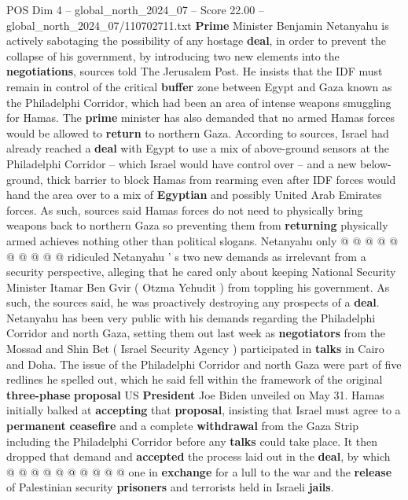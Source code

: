 \begin{textsample}{POS Dim 4 – global\_north\_2024\_07 – Score 22.00 – global\_north\_2024\_07/110702711.txt}  \label{ex:f4_pos_180}
\textbf{Prime} Minister Benjamin Netanyahu is actively sabotaging the possibility of any hostage \textbf{deal}, in order to prevent the collapse of his government, by introducing two new elements into the \textbf{negotiations}, sources told The Jerusalem Post.
He insists that the IDF must remain in control of the critical \textbf{buffer} zone between Egypt and Gaza known as the Philadelphi Corridor, which had been an area of intense weapons smuggling for Hamas.
The \textbf{prime} minister has also demanded that no armed Hamas forces would be allowed to \textbf{return} to northern Gaza.
According to sources, Israel had already reached a \textbf{deal} with Egypt to use a mix of above-ground sensors at the Philadelphi Corridor -- which Israel would have control over -- and a new below-ground, thick barrier to block Hamas from rearming even after IDF forces would hand the area over to a mix of \textbf{Egyptian} and possibly United Arab Emirates forces.
As such, sources said Hamas forces do not need to physically bring weapons back to northern Gaza so preventing them from \textbf{returning} physically armed achieves nothing other than political slogans.
Netanyahu only @ @ @ @ @ @ @ @ @ @ ridiculed Netanyahu ' s two new demands as irrelevant from a security perspective, alleging that he cared only about keeping National Security Minister Itamar Ben Gvir ( Otzma Yehudit ) from toppling his government.
As such, the sources said, he was proactively destroying any prospects of a \textbf{deal}.
Netanyahu has been very public with his demands regarding the Philadelphi Corridor and north Gaza, setting them out last week as \textbf{negotiators} from the Mossad and Shin Bet ( Israel Security Agency ) participated in \textbf{talks} in Cairo and Doha.
The issue of the Philadelphi Corridor and north Gaza were part of five redlines he spelled out, which he said fell within the framework of the original \textbf{three-phase} \textbf{proposal} US \textbf{President} Joe Biden unveiled on May 31.
Hamas initially balked at \textbf{accepting} that \textbf{proposal}, insisting that Israel must agree to a \textbf{permanent} \textbf{ceasefire} and a complete \textbf{withdrawal} from the Gaza Strip including the Philadelphi Corridor before any \textbf{talks} could take place.
It then dropped that demand and \textbf{accepted} the process laid out in the \textbf{deal}, by which @ @ @ @ @ @ @ @ @ @ one in \textbf{exchange} for a lull to the war and the \textbf{release} of Palestinian security \textbf{prisoners} and terrorists held in Israeli \textbf{jails}.

\end{textsample}
